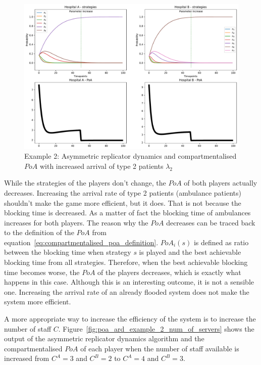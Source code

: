 \begin{figure}[H]
    \centering
    \includegraphics[width=\linewidth]{chapters/05_numerical_results/Bin/example_2/poa_ard_example_2_lambda_2.pdf}
    \caption{Example 2: Asymmetric replicator dynamics and compartmentalised
    \(PoA\) with increased arrival of type 2 patients \(\lambda_2\)}
    \label{fig:poa_ard_example_2_lambda_2}
\end{figure}

While the strategies of the players don't change, the \(PoA\) of both players
actually decreases.
Increasing the arrival rate of type 2 patients (ambulance patients) shouldn't
make the game more efficient, but it does.
That is not because the blocking time is decreased.
As a matter of fact the blocking time of ambulances increases for both players.
The reason why the \(PoA\) decreases can be traced back to the definition of the
\(PoA\) from equation~\ref{eq:compartmentalised_poa_definition}.
\(PoA_i(s)\) is defined as ratio between the blocking time when strategy \(s\)
is played and the best achievable blocking time from all strategies.
Therefore, when the best achievable blocking time becomes worse, the \(PoA\) of
the players decreases, which is exactly what happens in this case.
Although this is an interesting outcome, it is not a sensible one.
Increasing the arrival rate of an already flooded system does not make the
system more efficient.

A more appropriate way to increase the efficiency of the system is to increase
the number of staff \(C\).
Figure~\ref{fig:poa_ard_example_2_num_of_servers} shows the output of the
asymmetric replicator dynamics algorithm and the compartmentalised \(PoA\) of
each player when the number of staff available is increased from \(C^A = 3\)
and \(C^B = 2\) to \(C^A = 4\) and \(C^B = 3\).

